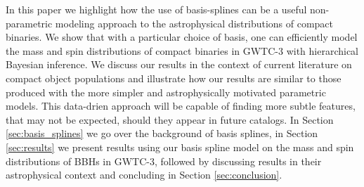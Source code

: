 In this paper we highlight how the use of basis-splines can be a useful non-parametric modeling approach to the astrophysical distributions of compact 
binaries. We show that with a particular choice of basis, one can efficiently model the mass and spin distributions of compact binaries in GWTC-3 with
hierarchical Bayesian inference. We discuss our results in the context of current literature on compact object populations and illustrate how our results are similar
to those produced with the more simpler and astrophysically motivated parametric models. This data-drien approach will be capable of finding more subtle features, that 
may not be expected, should they appear in future catalogs. In Section \ref{sec:basis_splines} we go over the background of basis splines, in Section \ref{sec:results} 
we present results using our basis spline model on the mass and spin distributions of BBHs in GWTC-3, followed by discussing results in their astrophysical context and concluding 
in Section \ref{sec:conclusion}.
